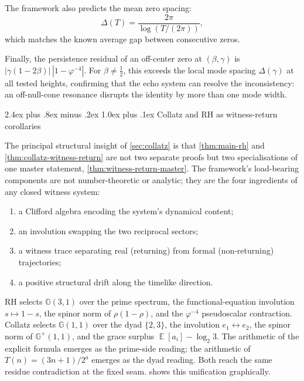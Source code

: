 \documentclass[11pt,a4paper]{article}
\makeatletter
\theoremstyle{plain}
\theoremstyle{definition}
\theoremstyle{remark}
\numberwithin{equation}{section}
\newcommand{\Cl}{\mathbb{G}}
\newcommand{\vp}{\varphi}
\DeclareMathOperator{\E}{\mathbb{E}}
\renewcommand{\subsection}{%
  \@startsection{subsection}{2}{0pt}%
    {2.4ex plus .8ex minus .2ex}%
    {1.0ex plus .1ex}%
    {\normalfont\Large\bfseries\color{headingAccent}}%
}
\makeatother
\begin{document}
The framework also predicts the mean zero spacing:
\[
  \Delta(T)=\frac{2\pi}{\log(T/(2\pi))},
\]
which matches the known average gap between consecutive zeros.

Finally, the persistence residual of an off-center zero at
\((\beta,\gamma)\) is \(|\gamma(1-2\beta)|\,|1-\vp^{-4}|\).  For
\(\beta\ne\tfrac12\), this exceeds the local mode spacing
\(\Delta(\gamma)\) at all tested heights, confirming that the echo
system can resolve the inconsistency: an off-null-cone resonance
disrupts the identity by more than one mode width.

\subsection{Collatz and RH as witness-return corollaries}
\label{subsec:collatz-rh-unification}

The principal structural insight of \cref{sec:collatz} is that
\cref{thm:main-rh} and \cref{thm:collatz-witness-return} are not
two separate proofs but two specialisations of one master
statement, \cref{thm:witness-return-master}.  The framework's
load-bearing components are not number-theoretic or analytic;
they are the four ingredients of any closed witness system:
\begin{enumerate}
  \item a Clifford algebra encoding the system's dynamical content;
  \item an involution swapping the two reciprocal sectors;
  \item a witness trace separating real (returning) from formal
        (non-returning) trajectories;
  \item a positive structural drift along the timelike direction.
\end{enumerate}
RH selects $\Cl(3,1)$ over the prime spectrum, the
functional-equation involution $s\mapsto1-s$, the spinor
norm of $\rho(1-\rho)$, and the $\vp^{-4}$ pseudoscalar
contraction.  Collatz selects $\Cl(1,1)$ over the dyad
$\{2,3\}$, the involution $e_1\leftrightarrow e_2$, the
spinor norm of $\Cl^+(1,1)$, and the grace surplus
$\E[a_i]-\log_2 3$.  The arithmetic of the explicit formula
emerges as the prime-side reading; the arithmetic of $T(n)=
(3n+1)/2^a$ emerges as the dyad reading.  Both reach the
same residue contradiction at the fixed seam.
 shows this
unification graphically.
\end{document}
